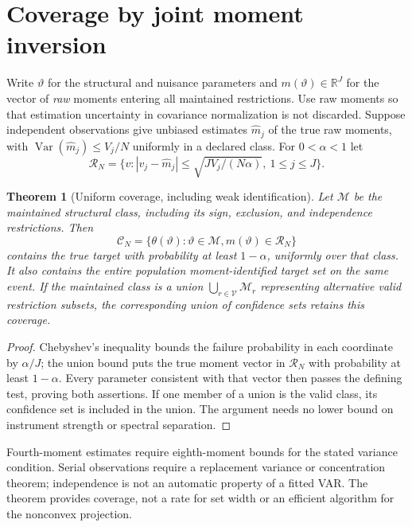 \documentclass[11pt,a4paper]{article}
\newtheorem{theorem}{Theorem}[section]
\theoremstyle{definition}
\theoremstyle{remark}
\newcommand{\R}{\mathbb{R}}
\DeclareMathOperator{\Var}{Var}
\begin{document}
\section{Coverage by joint moment inversion}
Write $\vartheta$ for the structural and nuisance parameters and $m(\vartheta)\in\R^J$ for the vector of \emph{raw} moments entering all maintained restrictions. Use raw moments so that estimation uncertainty in covariance normalization is not discarded. Suppose independent observations give unbiased estimates $\widehat m_j$ of the true raw moments, with
$\Var(\widehat m_j)\le V_j/N$ uniformly in a declared class. For $0<\alpha<1$ let
\[
 \mathcal R_N=\{v:|v_j-\widehat m_j|
          \le\sqrt{JV_j/(N\alpha)},\ 1\le j\le J\}.
\]
\begin{theorem}[Uniform coverage, including weak identification]
Let $\mathcal M$ be the maintained structural class, including its sign, exclusion, and independence restrictions. Then
\[
 \mathcal C_N=\{\theta(\vartheta):\vartheta\in\mathcal M,
                                m(\vartheta)\in\mathcal R_N\}
\]
contains the true target with probability at least $1-\alpha$, uniformly over that class. It also contains the entire population moment-identified target set on the same event. If the maintained class is a union $\bigcup_{r\in\mathcal V}\mathcal M_r$ representing alternative valid restriction subsets, the corresponding union of confidence sets retains this coverage.
\end{theorem}
\begin{proof}
Chebyshev's inequality bounds the failure probability in each coordinate by $\alpha/J$; the union bound puts the true moment vector in $\mathcal R_N$ with probability at least $1-\alpha$. Every parameter consistent with that vector then passes the defining test, proving both assertions. If one member of a union is the valid class, its confidence set is included in the union. The argument needs no lower bound on instrument strength or spectral separation.
\end{proof}
Fourth-moment estimates require eighth-moment bounds for the stated variance condition. Serial observations require a replacement variance or concentration theorem; independence is not an automatic property of a fitted VAR. The theorem provides coverage, not a rate for set width or an efficient algorithm for the nonconvex projection.
\end{document}
